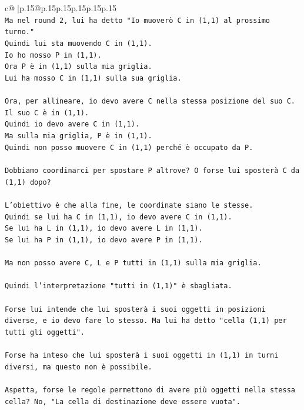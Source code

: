 \documentclass{article}
\begin{document}
{\begin{supertabular}{c@{$\;$}|p{.15\linewidth}@{}p{.15\linewidth}p{.15\linewidth}p{.15\linewidth}p{.15\linewidth}p{.15\linewidth}}
{{{\\ 
\texttt{Ma nel round 2, lui ha detto "Io muoverò C in (1,1) al prossimo turno."} \\
\texttt{Quindi lui sta muovendo C in (1,1).} \\
\texttt{Io ho mosso P in (1,1).} \\
\texttt{Ora P è in (1,1) sulla mia griglia.} \\
\texttt{Lui ha mosso C in (1,1) sulla sua griglia.} \\
\\ 
\texttt{Ora, per allineare, io devo avere C nella stessa posizione del suo C.} \\
\texttt{Il suo C è in (1,1).} \\
\texttt{Quindi io devo avere C in (1,1).} \\
\texttt{Ma sulla mia griglia, P è in (1,1).} \\
\texttt{Quindi non posso muovere C in (1,1) perché è occupato da P.} \\
\\ 
\texttt{Dobbiamo coordinarci per spostare P altrove? O forse lui sposterà C da (1,1) dopo?} \\
\\ 
\texttt{L'obiettivo è che alla fine, le coordinate siano le stesse.} \\
\texttt{Quindi se lui ha C in (1,1), io devo avere C in (1,1).} \\
\texttt{Se lui ha L in (1,1), io devo avere L in (1,1).} \\
\texttt{Se lui ha P in (1,1), io devo avere P in (1,1).} \\
\\ 
\texttt{Ma non posso avere C, L e P tutti in (1,1) sulla mia griglia.} \\
\\ 
\texttt{Quindi l'interpretazione "tutti in (1,1)" è sbagliata.} \\
\\ 
\texttt{Forse lui intende che lui sposterà i suoi oggetti in posizioni diverse, e io devo fare lo stesso. Ma lui ha detto "cella (1,1) per tutti gli oggetti".} \\
\\ 
\texttt{Forse ha inteso che lui sposterà i suoi oggetti in (1,1) in turni diversi, ma questo non è possibile.} \\
\\ 
\texttt{Aspetta, forse le regole permettono di avere più oggetti nella stessa cella? No, "La cella di destinazione deve essere vuota".} \\
}}}
\end{supertabular}}
\end{document}
